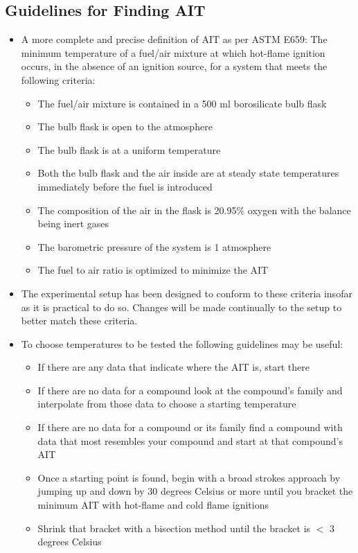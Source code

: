 \documentclass[letterpaper,11pt]{article}
\begin{document}
    \subsection{Guidelines for Finding AIT} \label{sec:guide}
    \begin{itemize}
    \item A more complete and precise definition of AIT as per ASTM E659: The 
        minimum temperature of a fuel/air mixture at which hot-flame 
        ignition occurs, in the absence of an ignition source, for a system that
        meets the following criteria:
        \begin{itemize}
        \item The fuel/air mixture is contained in a 500 ml borosilicate 
            bulb flask
        \item The bulb flask is open to the atmosphere
        \item The bulb flask is at a uniform temperature
        \item Both the bulb flask and the air inside are at steady state 
            temperatures immediately before the fuel is introduced
        \item The composition of the air in the flask is 20.95\% oxygen with the
            balance being inert gases
        \item The barometric pressure of the system is 1 atmosphere
        \item The fuel to air ratio is optimized to minimize the AIT
        \end{itemize}
    
    \item The experimental setup has been designed to conform to these criteria
        insofar as it is practical to do so. Changes will be made continually
        to the setup to better match these criteria.
    \item To choose temperatures to be tested the following guidelines may be 
        useful:
        \begin{itemize}
        \item If there are any data that indicate where the AIT is, start there
        \item If there are no data for a compound look at the compound's family 
            and interpolate from those data to choose a starting temperature
        \item If there are no data for a compound or its family find a compound 
            with data that most resembles your compound and start at that 
            compound's AIT
        \item Once a starting point is found, begin with a broad strokes 
            approach by jumping up and down by 30 degrees Celsius or more until 
            you bracket the minimum AIT with hot-flame and cold flame ignitions
        \item Shrink that bracket with a bisection method until the bracket is 
            $<$ 3 degrees Celsius
        \end{itemize}
    

\end{itemize}
\end{document}
